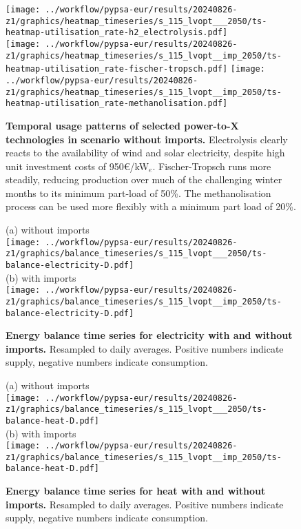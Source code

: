 \begin{figure*}
    \centering
    \footnotesize
    \texttt{[image: ../workflow/pypsa-eur/results/20240826-z1/graphics/heatmap\_timeseries/s\_115\_lvopt\_\_\_2050/ts-heatmap-utilisation\_rate-h2\_electrolysis.pdf]} \\
    \texttt{[image: ../workflow/pypsa-eur/results/20240826-z1/graphics/heatmap\_timeseries/s\_115\_lvopt\_\_imp\_2050/ts-heatmap-utilisation\_rate-fischer-tropsch.pdf]}
    \texttt{[image: ../workflow/pypsa-eur/results/20240826-z1/graphics/heatmap\_timeseries/s\_115\_lvopt\_\_imp\_2050/ts-heatmap-utilisation\_rate-methanolisation.pdf]}
    \caption{\textbf{Temporal usage patterns of selected power-to-X technologies
    in scenario without imports.} Electrolysis clearly reacts to the
    availability of wind and solar electricity, despite high unit investment
    costs of 950\euro/kW$_e$. Fischer-Tropsch runs more steadily, reducing
    production over much of the challenging winter months to its minimum
    part-load of 50\%. The methanolisation process can be used more flexibly
    with a minimum part load of 20\%.}
    \label{fig:si:power-to-x}
\end{figure*}


\begin{figure*}
    \centering
    \footnotesize
    (a) without imports \\
    \texttt{[image: ../workflow/pypsa-eur/results/20240826-z1/graphics/balance\_timeseries/s\_115\_lvopt\_\_\_2050/ts-balance-electricity-D.pdf]} \\
    (b) with imports \\
    \texttt{[image: ../workflow/pypsa-eur/results/20240826-z1/graphics/balance\_timeseries/s\_115\_lvopt\_\_imp\_2050/ts-balance-electricity-D.pdf]}
    \caption{\textbf{Energy balance time series for electricity with and without imports.} Resampled to daily averages. Positive numbers indicate supply, negative numbers indicate consumption.}
    \label{fig:si:balance-elec}
\end{figure*}

\begin{figure*}
    \centering
    \footnotesize
    (a) without imports \\
    \texttt{[image: ../workflow/pypsa-eur/results/20240826-z1/graphics/balance\_timeseries/s\_115\_lvopt\_\_\_2050/ts-balance-heat-D.pdf]} \\
    (b) with imports \\
    \texttt{[image: ../workflow/pypsa-eur/results/20240826-z1/graphics/balance\_timeseries/s\_115\_lvopt\_\_imp\_2050/ts-balance-heat-D.pdf]}
    \caption{\textbf{Energy balance time series for heat with and without imports.} Resampled to daily averages. Positive numbers indicate supply, negative numbers indicate consumption.}
    \label{fig:si:balance-heat}
\end{figure*}


